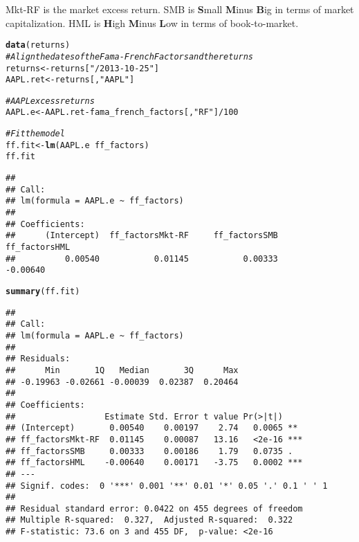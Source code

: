 \documentclass[a4paper]{article}\usepackage[]{graphicx}\usepackage[]{color}
\makeatletter
\newcommand{\hlstr}[1]{\textcolor[rgb]{0.192,0.494,0.8}{#1}}%
\newcommand{\hlcom}[1]{\textcolor[rgb]{0.678,0.584,0.686}{\textit{#1}}}%
\newcommand{\hlkwd}[1]{\textcolor[rgb]{0.737,0.353,0.396}{\textbf{#1}}}%
\newenvironment{kframe}{%
 \def\at@end@of@kframe{}%
 \ifinner\ifhmode%
  \def\at@end@of@kframe{\end{minipage}}%
  \begin{minipage}{\columnwidth}%
 \fi\fi%
 \def\FrameCommand##1{\hskip\@totalleftmargin \hskip-\fboxsep
 \colorbox{shadecolor}{##1}\hskip-\fboxsep
     \hskip-\linewidth \hskip-\@totalleftmargin \hskip\columnwidth}%
 \MakeFramed {\advance\hsize-\width
   \@totalleftmargin\z@ \linewidth\hsize
   \@setminipage}}%
 {\par\unskip\endMakeFramed%
 \at@end@of@kframe}
\newenvironment{knitrout}{}{} %
\makeatother
\begin{document}
Mkt-RF is the market excess return.
SMB is \textbf{S}mall \textbf{M}inus \textbf{B}ig in terms of market capitalization.
HML is \textbf{H}igh \textbf{M}inus \textbf{L}ow in terms of book-to-market.

\begin{knitrout}
\color{fgcolor}\begin{kframe}
\begin{alltt}
\hlkwd{data}(returns)
\hlcom{# Align the dates of the Fama-French Factors and the returns}
returns <- returns[\hlstr{"/2013-10-25"}]
AAPL.ret <- returns[, \hlstr{"AAPL"}]

\hlcom{# AAPL excess returns}
AAPL.e <- AAPL.ret - fama_french_factors[, \hlstr{"RF"}]/100
\end{alltt}
\end{kframe}
\end{knitrout}


\begin{knitrout}
\color{fgcolor}\begin{kframe}
\begin{alltt}
\hlcom{# Fit the model}
ff.fit <- \hlkwd{lm}(AAPL.e ~ ff_factors)
ff.fit
\end{alltt}
\begin{verbatim}
## 
## Call:
## lm(formula = AAPL.e ~ ff_factors)
## 
## Coefficients:
##      (Intercept)  ff_factorsMkt-RF     ff_factorsSMB     ff_factorsHML  
##          0.00540           0.01145           0.00333          -0.00640
\end{verbatim}
\begin{alltt}
\hlkwd{summary}(ff.fit)
\end{alltt}
\begin{verbatim}
## 
## Call:
## lm(formula = AAPL.e ~ ff_factors)
## 
## Residuals:
##      Min       1Q   Median       3Q      Max 
## -0.19963 -0.02661 -0.00039  0.02387  0.20464 
## 
## Coefficients:
##                  Estimate Std. Error t value Pr(>|t|)    
## (Intercept)       0.00540    0.00197    2.74   0.0065 ** 
## ff_factorsMkt-RF  0.01145    0.00087   13.16   <2e-16 ***
## ff_factorsSMB     0.00333    0.00186    1.79   0.0735 .  
## ff_factorsHML    -0.00640    0.00171   -3.75   0.0002 ***
## ---
## Signif. codes:  0 '***' 0.001 '**' 0.01 '*' 0.05 '.' 0.1 ' ' 1
## 
## Residual standard error: 0.0422 on 455 degrees of freedom
## Multiple R-squared:  0.327,	Adjusted R-squared:  0.322 
## F-statistic: 73.6 on 3 and 455 DF,  p-value: <2e-16
\end{verbatim}
\end{kframe}
\end{knitrout}
\end{document}

